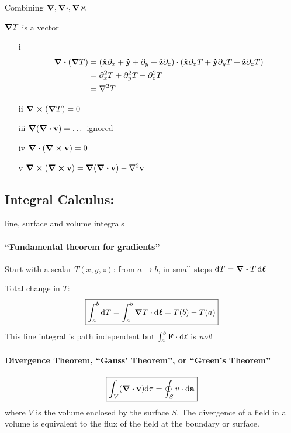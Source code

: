\documentclass[../main.tex]{subfiles}
\begin{document}
Combining $\grad, \div, \curl$

$\grad T$ is a vector

\begin{enumerate}
    \item[i] 
    \begin{align*}
        \div(\grad T) &= (\vu x \partial_x + \vu y + \partial_y + \vu z \partial_z) \cdot (\vu x \partial_x T + \vu y \partial_y T + \vu z \partial_z T) \\
        &= \partial_x^2 T + \partial_y^2 T + \partial_z^2 T \\
        &= \laplacian T
    \end{align*}
    \item[ii] $\curl (\grad T) = 0$
    \item[iii] $\grad(\div \vb v) = \dots$ ignored
    \item[iv] $\div(\curl \vb v) = 0$
    \item[v] $\curl(\curl \vb v) = \grad(\div \vb v) - \laplacian \vb v$
\end{enumerate}

\subsection{Integral Calculus:}

line, surface and volume integrals

\paragraph*{``Fundamental theorem for gradients''}

Start with a scalar $T(x,y,z)$: from $a \to b$, in small steps $\dd{T} = \div T \dd{\vb*\ell}$

Total change in $T$:
\begin{align*}
    \boxed{\int_a^b \dd T = \int_a^b \grad T \cdot \dd{\vb*\ell} = T(b) - T(a)} 
\end{align*}
This line integral is path independent but $\int_a^b \vb F \cdot \dd{\vb \ell}$ is \emph{not}!

\paragraph*{Divergence Theorem, ``Gauss' Theorem'', or ``Green's Theorem''}

\begin{align*}
    \boxed{
        \int_V (\div \vb v) \dd \tau = \oint_S \vb \vb v \cdot \dd{\vb a}
    }
\end{align*}
where $V$ is the volume enclosed by the surface $S$. The divergence of a field in a volume is equivalent to the flux of the field at the boundary or surface.
\end{document}
